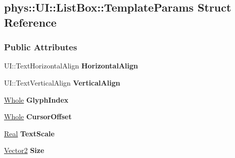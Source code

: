 \hypertarget{structphys_1_1UI_1_1ListBox_1_1TemplateParams}{
\subsection{phys::UI::ListBox::TemplateParams Struct Reference}
\label{structphys_1_1UI_1_1ListBox_1_1TemplateParams}
}
\subsubsection*{Public Attributes}
\begin{DoxyCompactItemize}
\item 
\hypertarget{structphys_1_1UI_1_1ListBox_1_1TemplateParams_aa94d309daf7a156437469d60f16cdd56}{
UI::TextHorizontalAlign {\bfseries HorizontalAlign}}
\label{structphys_1_1UI_1_1ListBox_1_1TemplateParams_aa94d309daf7a156437469d60f16cdd56}

\item 
\hypertarget{structphys_1_1UI_1_1ListBox_1_1TemplateParams_a9059d03eeca2c88b01651165ab628fb3}{
UI::TextVerticalAlign {\bfseries VerticalAlign}}
\label{structphys_1_1UI_1_1ListBox_1_1TemplateParams_a9059d03eeca2c88b01651165ab628fb3}

\item 
\hypertarget{structphys_1_1UI_1_1ListBox_1_1TemplateParams_a81846631ab90163e76c003efb41881c5}{
\hyperlink{namespacephys_a460f6bc24c8dd347b05e0366ae34f34a}{Whole} {\bfseries GlyphIndex}}
\label{structphys_1_1UI_1_1ListBox_1_1TemplateParams_a81846631ab90163e76c003efb41881c5}

\item 
\hypertarget{structphys_1_1UI_1_1ListBox_1_1TemplateParams_ac00d77cc721f790866d3ae353b22a4ce}{
\hyperlink{namespacephys_a460f6bc24c8dd347b05e0366ae34f34a}{Whole} {\bfseries CursorOffset}}
\label{structphys_1_1UI_1_1ListBox_1_1TemplateParams_ac00d77cc721f790866d3ae353b22a4ce}

\item 
\hypertarget{structphys_1_1UI_1_1ListBox_1_1TemplateParams_a1cfd87311c41d2143b1446621cb68a57}{
\hyperlink{namespacephys_af7eb897198d265b8e868f45240230d5f}{Real} {\bfseries TextScale}}
\label{structphys_1_1UI_1_1ListBox_1_1TemplateParams_a1cfd87311c41d2143b1446621cb68a57}

\item 
\hypertarget{structphys_1_1UI_1_1ListBox_1_1TemplateParams_ad133a43170da4860798c8bfd91ac7581}{
\hyperlink{classphys_1_1Vector2}{Vector2} {\bfseries Size}}
\label{structphys_1_1UI_1_1ListBox_1_1TemplateParams_ad133a43170da4860798c8bfd91ac7581}


\end{DoxyCompactItemize}
